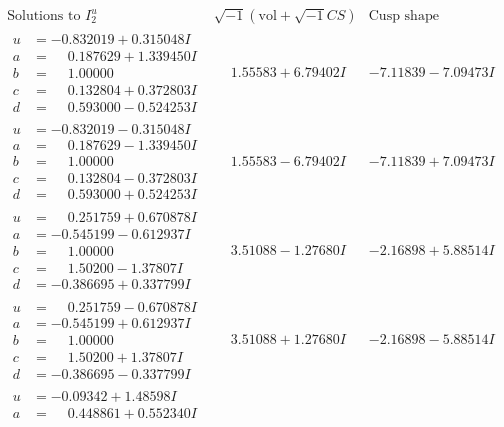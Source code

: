 \documentclass[1p]{elsarticle_modified}
\theoremstyle{definition}
\newcommand{\I}{\sqrt{-1}}
\begin{document}
$$\begin{array}{c|c|c}  
\text{Solutions to }I^u_{2}& \I (\text{vol} + \sqrt{-1}CS) & \text{Cusp shape}\\
 \hline 
\begin{aligned}
u &= -0.832019 + 0.315048 I \\
a &= \phantom{-}0.187629 + 1.339450 I \\
b &= \phantom{-}1.00000\phantom{ +0.000000I} \\
c &= \phantom{-}0.132804 + 0.372803 I \\
d &= \phantom{-}0.593000 - 0.524253 I\end{aligned}
 & \phantom{-}1.55583 + 6.79402 I & -7.11839 - 7.09473 I \\ \hline\begin{aligned}
u &= -0.832019 - 0.315048 I \\
a &= \phantom{-}0.187629 - 1.339450 I \\
b &= \phantom{-}1.00000\phantom{ +0.000000I} \\
c &= \phantom{-}0.132804 - 0.372803 I \\
d &= \phantom{-}0.593000 + 0.524253 I\end{aligned}
 & \phantom{-}1.55583 - 6.79402 I & -7.11839 + 7.09473 I \\ \hline\begin{aligned}
u &= \phantom{-}0.251759 + 0.670878 I \\
a &= -0.545199 - 0.612937 I \\
b &= \phantom{-}1.00000\phantom{ +0.000000I} \\
c &= \phantom{-}1.50200 - 1.37807 I \\
d &= -0.386695 + 0.337799 I\end{aligned}
 & \phantom{-}3.51088 - 1.27680 I & -2.16898 + 5.88514 I \\ \hline\begin{aligned}
u &= \phantom{-}0.251759 - 0.670878 I \\
a &= -0.545199 + 0.612937 I \\
b &= \phantom{-}1.00000\phantom{ +0.000000I} \\
c &= \phantom{-}1.50200 + 1.37807 I \\
d &= -0.386695 - 0.337799 I\end{aligned}
 & \phantom{-}3.51088 + 1.27680 I & -2.16898 - 5.88514 I \\ \hline\begin{aligned}
u &= -0.09342 + 1.48598 I \\
a &= \phantom{-}0.448861 + 0.552340 I \\

\end{aligned}
\end{array}$$
\end{document}
